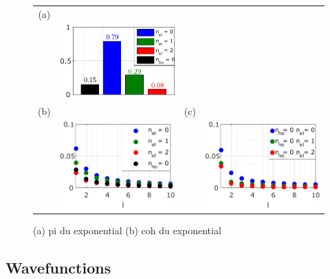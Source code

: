 \begin{figure}[hptb]
	\begin{center}
		\begin{tabular}{c c c c}
			(a) & & &   \\ 
			& \includegraphics[width = 5cm]{./appC/JnlData_exponential_50ps_1e_JMAP_f_vf_proba} &
			&  \\
			(b) & & (c) & \\
			& \includegraphics[width = 5cm]{./appC/JnlData_exponential_50ps_1e_JMAP_f_vf_coh_inter_period} &
			& \includegraphics[width = 5cm]{./appC/JnlData_exponential_50ps_1e_JMAP_f_vf_coh_el_ho}
		\end{tabular} 
	\end{center}
	\caption{(a) pi du exponential (b) coh du exponential}
	\label{fig: Jnl exponantial}
\end{figure}

\subsection{Wavefunctions}

